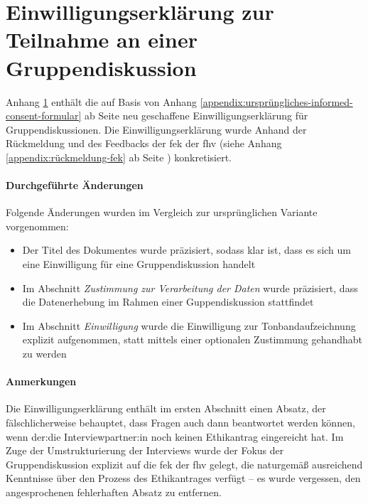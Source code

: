 \documentclass[a4paper,12pt,twoside]{scrreprt}
\begin{document}


\cleardoublepage
\chapter{Einwilligungserklärung zur Teilnahme an einer Gruppendiskussion}
\label{appendix:informed-consent-gruppendiskussion}

Anhang \ref{appendix:informed-consent-gruppendiskussion} enthält die auf Basis von Anhang \ref{appendix:ursprüngliches-informed-consent-formular} ab Seite \pageref{appendix:ursprüngliches-informed-consent-formular} neu geschaffene Einwilligungserklärung für Gruppendiskussionen. Die Einwilligungserklärung wurde Anhand der Rückmeldung und des Feedbacks der \acl{fek} der \acl{fhv} (siehe Anhang \ref{appendix:rückmeldung-fek} ab Seite \pageref{appendix:rückmeldung-fek}) konkretisiert.

\subsubsection*{Durchgeführte Änderungen}
\label{appendix:änderungen-informed-consent-gruppendiskussion}

Folgende Änderungen wurden im Vergleich zur ursprünglichen Variante vorgenommen:
\begin{itemize}
    \item Der Titel des Dokumentes wurde präzisiert, sodass klar ist, dass es sich um eine Einwilligung für eine Gruppendiskussion handelt
    \item Im Abschnitt \textit{Zustimmung zur Verarbeitung der Daten} wurde präzisiert, dass die Datenerhebung im Rahmen einer Guppendiskussion stattfindet
    \item Im Abschnitt \textit{Einwilligung} wurde die Einwilligung zur Tonbandaufzeichnung explizit aufgenommen, statt mittels einer optionalen Zustimmung gehandhabt zu werden
\end{itemize}

\subsubsection*{Anmerkungen}
\label{appendix:anmerkungen-informed-consent-gruppendiskussion}

Die Einwilligungserklärung enthält im ersten Abschnitt einen Absatz, der fälschlicherweise behauptet, dass Fragen auch dann beantwortet werden können, wenn der:die Interviewpartner:in noch keinen Ethikantrag eingereicht hat. Im Zuge der Umstrukturierung der Interviews wurde der Fokus der Gruppendiskussion explizit auf die \acl{fek} der \acl{fhv} gelegt, die naturgemäß ausreichend Kenntnisse über den Prozess des Ethikantrages verfügt -- es wurde vergessen, den angesprochenen fehlerhaften Absatz zu entfernen.
\end{document}
